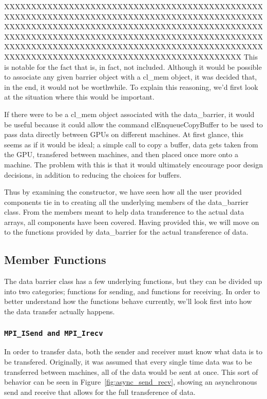 \documentclass[thesis.tex]{subfiles}
\begin{document}
  XXXXXXXXXXXXXXXXXXXXXXXXXXXXXXXXXXXXXXXXXXXXXXXXXXXXXXXXXXXXXXXXXXXXXXXXXXXXXXXXXXXXXXXXXXXXXXXXXXXXXXXXXXXXXXXXXXXXXXXXXXXXXXXXXXXXXXXXXXXXXXXXXXXXXXXXXXXXXXXXXXXXXXXXXXXXXXXXXXXXXXXXXXXXXXXXXXXXXXXXXXXXXXXXXXXXXXXXXXXXXXXXXXXXXXXXXXXXXXXXXXXXXXXXXXXXXXXXXXXXXXXXXXXXXXXXXXXXXXXXXXXX
    This is notable for the fact that is, in fact, not included. Although it would be possible to associate any given barrier object with a cl\_mem object, it was decided that, in the end, it would not be worthwhile. To explain this reasoning, we'd first look at the situation where this would be important.

    If there were to be a cl\_mem object associated with the data\_barrier, it would be useful because it could allow the command clEnqueueCopyBuffer to be used to pass data directly between GPUs on different machines. At first glance, this seems as if it would be ideal; a simple call to copy a buffer, data gets taken from the GPU, transfered between machines, and then placed once more onto a machine. The problem with this is that it would ultimately encourage poor design decisions, in addition to reducing the choices for buffers. 

  Thus by examining the constructor, we have seen how all the user provided components tie in to creating all the underlying members of the data\_barrier class. From the members meant to help data transference to the actual data arrays, all components have been covered. Having provided this, we will move on to the functions provided by data\_barrier for the actual transference of data.

\subsection{Member Functions} %
\label{sub:member_functions}
  The data barrier class has a few underlying functions, but they can be divided up into two categories; functions for sending, and functions for receiving. In order to better understand how the functions behave currently, we'll look first into how the data transfer actually happens.

  \subsubsection{\texttt{MPI\_ISend and MPI\_Irecv}} %
  \label{ssub:mpisend_and_mpi_recv}
    In order to transfer data, both the sender and receiver must know what data is to be transfered. Originally, it was assumed that every single time data was to be transferred between machines, all of the data would be sent at once. This sort of behavior can be seen in Figure~\ref{fig:async_send_recv}, showing an asynchronous send and receive that allows for the full transference of data.
\end{document}
